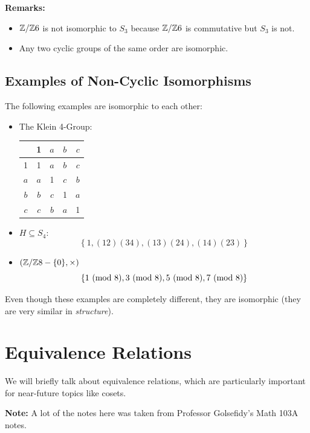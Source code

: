 \documentclass[letterpaper]{article}
\begin{document}
\textbf{Remarks:}
\begin{itemize}
    \item $\mathbb{Z} / \mathbb{Z} 6$ is not isomorphic to $S_3$ because $\mathbb{Z} / \mathbb{Z} 6$ is commutative but $S_3$ is not. 
    \item Any two cyclic groups of the same order are isomorphic. 
\end{itemize} 

\subsection{Examples of Non-Cyclic Isomorphisms}
The following examples are isomorphic to each other: 
\begin{itemize}
    \item The Klein 4-Group: 
    \begin{center}
        \begin{tabular}{c|c|c|c|c}
                & 1 & $a$ & $b$ & $c$ \\ 
            \hline 
            1   & 1 & $a$ & $b$ & $c$ \\ 
            $a$ & $a$ & 1 & $c$ & $b$ \\ 
            $b$ & $b$ & $c$ & 1 & $a$ \\ 
            $c$ & $c$ & $b$ & $a$ & 1
        \end{tabular}
    \end{center}

    \item $H \subseteq S_4$: 
    \[\left\{1, (12)(34), (13)(24), (14)(23)\right\}\]

    \item $(\mathbb{Z} / \mathbb{Z} 8 - \{0\}, \times)$
    \[\{1 \ (\mathrm{mod}\ 8), 3 \ (\mathrm{mod}\ 8), 5 \ (\mathrm{mod}\ 8), 7 \ (\mathrm{mod}\ 8)\}\]
\end{itemize}
Even though these examples are completely different, they are isomorphic (they are very similar in \emph{structure}). 










\newpage 
\section{Equivalence Relations}
We will briefly talk about equivalence relations, which are particularly important for near-future topics like cosets.

\bigskip 

\textbf{Note:} A lot of the notes here was taken from Professor Golsefidy's Math 103A notes. 
\end{document}
